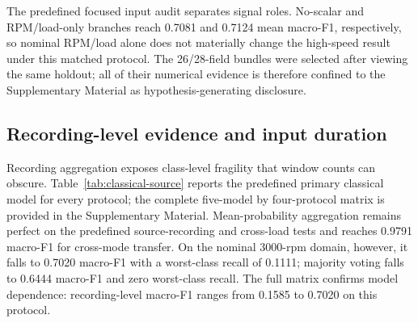 \documentclass[11pt]{article}
\begin{document}
The predefined focused input audit separates signal roles. No-scalar and RPM/load-only branches reach 0.7081 and 0.7124 mean macro-F1, respectively, so nominal RPM/load alone does not materially change the high-speed result under this matched protocol. The 26/28-field bundles were selected after viewing the same holdout; all of their numerical evidence is therefore confined to the Supplementary Material as hypothesis-generating disclosure.


\begin{table}[H]
\centering
\caption{Predefined input-definition audit for the 1000/2000-to-3000-rpm holdout. Values are means and standard deviations across five optimization seeds. Post-hoc 26/28-field configurations are excluded and reported only in the Supplementary Material.}
\label{tab:fusion}
\small
{}
\end{table}


\subsection{Recording-level evidence and input duration}
Recording aggregation exposes class-level fragility that window counts can obscure. Table~\ref{tab:classical-source} reports the predefined primary classical model for every protocol; the complete five-model by four-protocol matrix is provided in the Supplementary Material. Mean-probability aggregation remains perfect on the predefined source-recording and cross-load tests and reaches 0.9791 macro-F1 for cross-mode transfer. On the nominal 3000-rpm domain, however, it falls to 0.7020 macro-F1 with a worst-class recall of 0.1111; majority voting falls to 0.6444 macro-F1 and zero worst-class recall. The full matrix confirms model dependence: recording-level macro-F1 ranges from 0.1585 to 0.7020 on this protocol.
\end{document}
